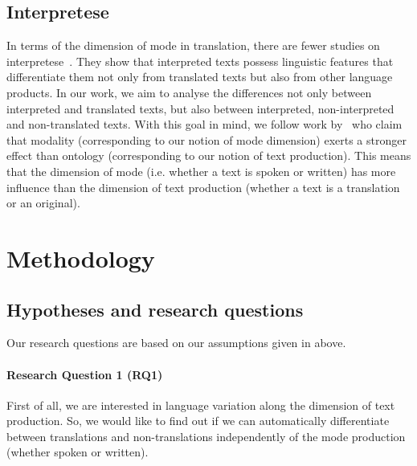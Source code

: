 \documentclass[output=paper,colorlinks,citecolor=brown]{langscibook}
\begin{document}
\subsection{Interpretese}\label{ssec:interpretese}
In terms of the dimension of mode  in translation, there are fewer studies on
interpretese~\citep{KajzerWietrzny2012,DefrancqEtAl2015,HeEtAl2016,BernardiniEtAl2016,FerraresiMilicevic2017,Dayter2018,BizzoniTeich2019}. They show that interpreted texts possess linguistic features that differentiate them not only from translated texts but also from other language products. In our work, we aim to analyse the differences not only between interpreted and translated texts, but also between interpreted, non-interpreted and non-translated texts. With this goal in mind, we follow work by~\citet{ShlesingerOrdan2012} who claim that modality (corresponding to our notion of mode dimension) exerts a stronger effect than ontology (corresponding to our notion of text production). %
This means that the dimension of mode (i.e. whether a text is spoken or written) has more influence than the dimension of text production (whether a text is a translation or an original).

\largerpage
\section{Methodology}\label{sec:datamethods}
\subsection{Hypotheses and research questions}\label{sec:hypotheses}
Our research questions are based on our assumptions given in  above.

\paragraph*{Research Question 1 (RQ1)} First of all, we are interested in language variation along the dimension of text production. So, we would like to find out if we can automatically differentiate between translations and non-translations independently of %
the mode production (whether spoken or written).
\end{document}
